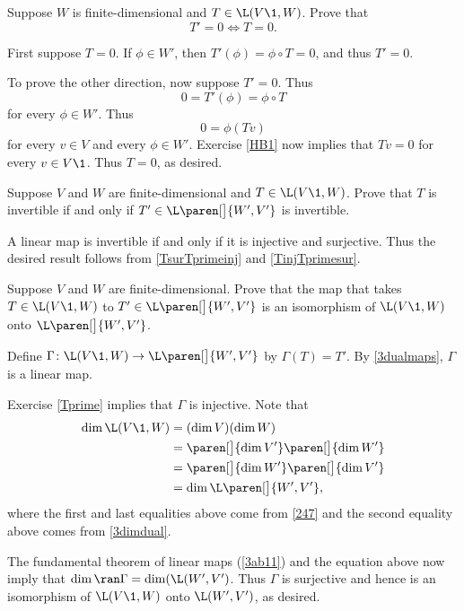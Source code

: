 \exercise
Suppose $W$ is finite-dimensional and $T \in \L(V\1, W)$. Prove that \label{Tprime}
\[
T' = 0 \iff T = 0.
\]
\exercisedisplayend

\begin{Solution}
First suppose $T = 0$. If $\phi \in W'\!$, then $T' \! (\phi) = \phi \circ T = 0$, and thus $T' = 0$.

To prove the other direction, now suppose $T' = 0$. Thus
\[
0 = T' \! (\phi) = \phi \circ T
\]
for every $\phi \in W'\!$. Thus
\[
0 = \phi(Tv)
\]
for every $v \in V$ and every $\phi \in W'\!$. Exercise \ref{HB1} now implies that $Tv = 0$ for every $v \in V\1$. Thus $T = 0$, as desired.
\end{Solution}

\exercise
Suppose $V$ and $W$ are finite-dimensional and $T \in \L(V\1, W)$. Prove that $T$ is invertible if and only if $T' \in \L\paren[\big]{W', V'}$ is invertible.

\begin{Solution}
A linear map is invertible if and only if it is injective and surjective. Thus the desired result follows from \ref{TsurTprimeinj} and \ref{TinjTprimesur}.
\end{Solution}

\exercise
Suppose $V$ and $W$ are finite-dimensional. Prove that the map that takes $T \in \L(V\1,W)$ to $T' \in \L\paren[\big]{W', V'}$ is an isomorphism of $\L(V\1,W)$ onto $\L\paren[\big]{W', V'}$.

\begin{Solution}
Define $\Gamma \colon \L(V\1,W) \to \L\paren[\big]{W', V'}$ by $\Gamma(T) = T'\!$. By \ref{3dualmaps}, $\Gamma$ is a linear map.

Exercise \ref{Tprime} implies that $\Gamma$ is injective. Note that
\begin{align*}
\dim \L(V\1, W) &= (\dim V)(\dim W) \\
&= \paren[\big]{\dim V'} \paren[\big]{\dim W'} \\
&= \paren[\big]{\dim W'} \paren[\big]{\dim V'} \\
&= \dim \L\paren[\big]{W', V'},
\end{align*}
where the first and last equalities above come from \ref{247}
and the second equality above comes from \ref{3dimdual}.

The fundamental theorem of linear maps (\ref{3ab11}) and the equation above now imply that $\dim \ran \Gamma = \dim (\L(W', V')$. Thus $\Gamma$ is surjective and hence is an isomorphism of $\L(V\1,W)$ onto $\L(W', V')$, as desired.
\end{Solution}

